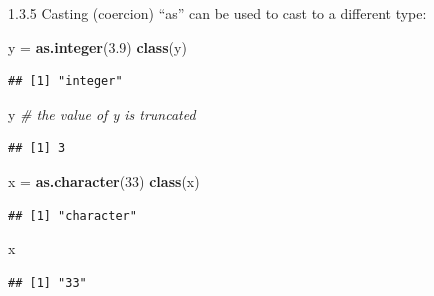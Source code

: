 \documentclass[
  ignorenonframetext,
]{beamer}
\newenvironment{Shaded}{\begin{snugshade}}{\end{snugshade}}
\newcommand{\CommentTok}[1]{\textcolor[rgb]{0.56,0.35,0.01}{\textit{#1}}}
\newcommand{\DecValTok}[1]{\textcolor[rgb]{0.00,0.00,0.81}{#1}}
\newcommand{\FloatTok}[1]{\textcolor[rgb]{0.00,0.00,0.81}{#1}}
\newcommand{\FunctionTok}[1]{\textcolor[rgb]{0.13,0.29,0.53}{\textbf{#1}}}
\newcommand{\NormalTok}[1]{#1}
\newcommand{\OtherTok}[1]{\textcolor[rgb]{0.56,0.35,0.01}{#1}}
\begin{document}
\begin{frame}[fragile]{1.3.5 Casting (coercion)}
\protect\hypertarget{casting-coercion}{}
``as'' can be used to cast to a different type:

\begin{Shaded}
\begin{Highlighting}[]
\NormalTok{y }\OtherTok{=} \FunctionTok{as.integer}\NormalTok{(}\FloatTok{3.9}\NormalTok{)}
\FunctionTok{class}\NormalTok{(y)}
\end{Highlighting}
\end{Shaded}

\begin{verbatim}
## [1] "integer"
\end{verbatim}

\begin{Shaded}
\begin{Highlighting}[]
\NormalTok{y }\CommentTok{\# the value of y is truncated}
\end{Highlighting}
\end{Shaded}

\begin{verbatim}
## [1] 3
\end{verbatim}

\begin{Shaded}
\begin{Highlighting}[]
\NormalTok{x }\OtherTok{=} \FunctionTok{as.character}\NormalTok{(}\DecValTok{33}\NormalTok{)}
\FunctionTok{class}\NormalTok{(x)}
\end{Highlighting}
\end{Shaded}

\begin{verbatim}
## [1] "character"
\end{verbatim}

\begin{Shaded}
\begin{Highlighting}[]
\NormalTok{x}
\end{Highlighting}
\end{Shaded}

\begin{verbatim}
## [1] "33"
\end{verbatim}
\end{frame}
\end{document}

